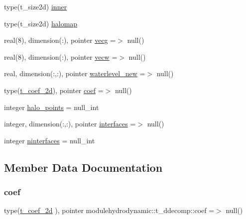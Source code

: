 \begin{DoxyCompactItemize}
\item 
type(t\+\_\+size2d) \mbox{\hyperlink{structmodulehydrodynamic_1_1t__ddecomp_a46149e9ec23ac5b689a5862f916c9bd7}{inner}}
\item 
type(t\+\_\+size2d) \mbox{\hyperlink{structmodulehydrodynamic_1_1t__ddecomp_a6b62f3ad3b2bfccbd2730b7449d563ed}{halomap}}
\item 
real(8), dimension(\+:), pointer \mbox{\hyperlink{structmodulehydrodynamic_1_1t__ddecomp_a2e659c5ef27db03d6cc99947aa4c88e9}{vecg}} =$>$ null()
\item 
real(8), dimension(\+:), pointer \mbox{\hyperlink{structmodulehydrodynamic_1_1t__ddecomp_a64769de2d822805ed2c48a6f53eb8821}{vecw}} =$>$ null()
\item 
real, dimension(\+:,\+:), pointer \mbox{\hyperlink{structmodulehydrodynamic_1_1t__ddecomp_ad4169bce78e8cd9423a554b2a1e1f801}{waterlevel\+\_\+new}} =$>$ null()
\item 
type(\mbox{\hyperlink{structmodulehydrodynamic_1_1t__coef__2d}{t\+\_\+coef\+\_\+2d}}), pointer \mbox{\hyperlink{structmodulehydrodynamic_1_1t__ddecomp_af13c37edfaecf779e741f21bd121e9e3}{coef}} =$>$ null()
\item 
integer \mbox{\hyperlink{structmodulehydrodynamic_1_1t__ddecomp_a4285891103bcae438f841969804fe1bc}{halo\+\_\+points}} = null\+\_\+int
\item 
integer, dimension(\+:,\+:), pointer \mbox{\hyperlink{structmodulehydrodynamic_1_1t__ddecomp_a6a6ebb05b7fbf69e565a468b253ae6b8}{interfaces}} =$>$ null()
\item 
integer \mbox{\hyperlink{structmodulehydrodynamic_1_1t__ddecomp_a29c29d398dade2401cdfeb1a9cff0aa0}{ninterfaces}} = null\+\_\+int
\end{DoxyCompactItemize}


\subsection{Member Data Documentation}
\mbox{\label{structmodulehydrodynamic_1_1t__ddecomp_af13c37edfaecf779e741f21bd121e9e3}} 
\subsubsection{\texorpdfstring{coef}{coef}}
{\footnotesize\ttfamily type(\mbox{\hyperlink{structmodulehydrodynamic_1_1t__coef__2d}{t\+\_\+coef\+\_\+2d}} ), pointer modulehydrodynamic\+::t\+\_\+ddecomp\+::coef =$>$ null()\hspace{0.3cm}{\ttfamily [private]}}

